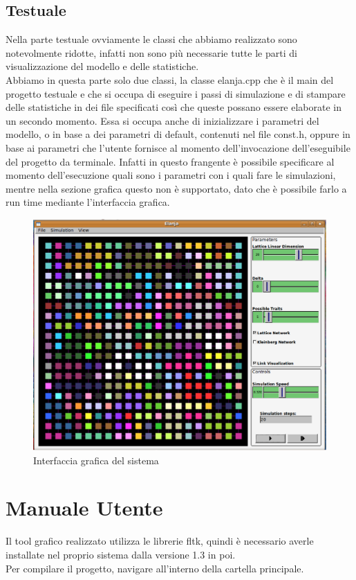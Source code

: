 \documentclass[a4paper,12pt]{article}
\begin{document}
\subsection{Testuale}
Nella parte testuale ovviamente le classi che abbiamo realizzato sono notevolmente ridotte, infatti non sono pi\`u necessarie tutte le parti
di visualizzazione del modello e delle statistiche.\\
Abbiamo in questa parte solo due classi, la classe elanja.cpp che \`e il main del progetto testuale e che si occupa di eseguire i passi di 
simulazione e di stampare delle statistiche in dei file specificati cos\`i che queste possano essere elaborate in un secondo momento. Essa si 
occupa anche di inizializzare i parametri del modello, o in base a dei parametri di default, contenuti nel file const.h, oppure in base ai
parametri che l'utente fornisce al momento dell'invocazione dell'eseguibile del progetto da terminale. Infatti in questo frangente \`e 
possibile specificare al momento dell'esecuzione quali sono i parametri con i quali fare le simulazioni, mentre nella sezione grafica questo 
non \`e supportato, dato che \`e possibile farlo a run time mediante l'interfaccia grafica.

\begin{figure}[!ht]
\begin{center}
\includegraphics[width=\textwidth]{elanja.eps}
\end{center}
\caption{Interfaccia grafica del sistema}
\end{figure}

\clearpage 
\section{Manuale Utente}
Il tool grafico realizzato utilizza le librerie fltk, quindi \`e necessario averle installate nel proprio sistema dalla versione 1.3 in poi.\\
Per compilare il progetto, navigare all'interno della cartella principale.
\end{document}
